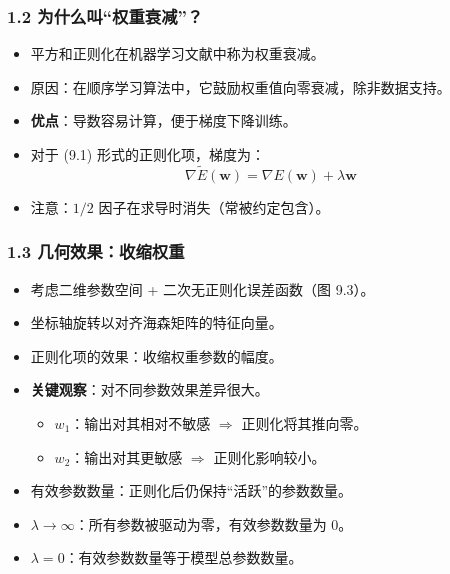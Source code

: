 \documentclass[t,aspectratio=169]{beamer} %
\begin{document}
\begin{frame}
    \frametitle{1.2 为什么叫“权重衰减”？}
    \begin{itemize}
        \item 平方和正则化在机器学习文献中称为\alert{权重衰减}。
        \item 原因：在顺序学习算法中，它鼓励权重值\alert{向零衰减}，除非数据支持。
        \item \textbf{优点}：导数容易计算，便于梯度下降训练。
        \item 对于 (9.1) 形式的正则化项，梯度为：
        \begin{equation}
            \nabla \widetilde{E}(\mathbf{w}) = \nabla E(\mathbf{w}) + \lambda \mathbf{w}
            \tag{9.5}
        \end{equation}
        \item 注意：$1/2$ 因子在求导时消失（常被约定包含）。
    \end{itemize}
\end{frame}

\begin{frame}
    \frametitle{1.3 几何效果：收缩权重}
    \begin{itemize}
        \item 考虑二维参数空间 + 二次无正则化误差函数（图 9.3）。
        \item 坐标轴旋转以对齐\alert{海森矩阵的特征向量}。
        \item 正则化项的效果：\alert{收缩权重参数的幅度}。
        \item \textbf{关键观察}：对不同参数效果差异很大。
        \begin{itemize}
            \item $w_1$：输出对其相对不敏感 $\Rightarrow$ 正则化将其推向零。
            \item $w_2$：输出对其更敏感 $\Rightarrow$ 正则化影响较小。
        \end{itemize}
        \item \alert{有效参数数量}：正则化后仍保持“活跃”的参数数量。
        \item $\lambda \to \infty$：所有参数被驱动为零，有效参数数量为 0。
        \item $\lambda = 0$：有效参数数量等于模型总参数数量。
    \end{itemize}
\end{frame}
\end{document}
